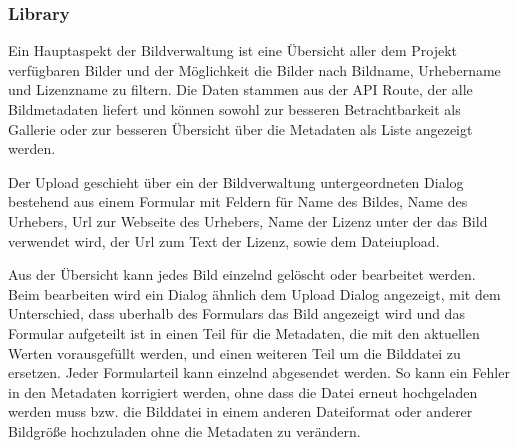 \subsubsection{Library}

Ein Hauptaspekt der Bildverwaltung ist eine Übersicht aller dem Projekt
verfügbaren Bilder und der Möglichkeit die Bilder nach Bildname, Urhebername und
Lizenzname zu filtern. Die Daten stammen aus der API Route, der alle
Bildmetadaten liefert und können sowohl zur besseren Betrachtbarkeit als
Gallerie oder zur besseren Übersicht über die Metadaten als Liste angezeigt
werden.  

Der Upload geschieht über ein der Bildverwaltung untergeordneten Dialog
bestehend aus einem Formular mit Feldern für Name des Bildes, Name des Urhebers, Url zur
Webseite des Urhebers, Name der Lizenz unter der das Bild verwendet wird, der
Url zum Text der Lizenz, sowie dem Dateiupload.

Aus der Übersicht kann jedes Bild einzelnd gelöscht oder bearbeitet werden. Beim
bearbeiten wird ein Dialog ähnlich dem Upload Dialog angezeigt, mit dem
Unterschied, dass uberhalb des Formulars das Bild angezeigt wird und das
Formular aufgeteilt ist in einen Teil für die Metadaten, die mit den aktuellen
Werten vorausgefüllt werden, und einen weiteren Teil um die Bilddatei zu
ersetzen. Jeder Formularteil kann einzelnd abgesendet werden. So kann ein Fehler
in den Metadaten korrigiert werden, ohne dass die Datei erneut hochgeladen
werden muss bzw. die Bilddatei in einem anderen Dateiformat oder anderer
Bildgröße hochzuladen ohne die Metadaten zu verändern.

